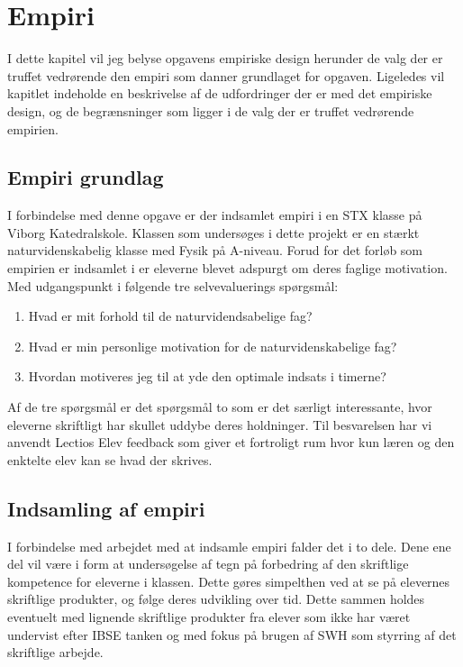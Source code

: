 \chapter{Empiri}
\label{Ch:3}

I dette kapitel vil jeg belyse opgavens empiriske design herunder de valg der er truffet vedrørende den empiri som danner grundlaget for opgaven. Ligeledes vil kapitlet indeholde en beskrivelse af de udfordringer der er med det empiriske design, og de begrænsninger som ligger i de valg der er truffet vedrørende empirien. 

\section{Empiri grundlag}
\label{sec:3.1}
I forbindelse med denne opgave er der indsamlet empiri i en STX klasse på Viborg Katedralskole. Klassen som undersøges i dette projekt er en stærkt naturvidenskabelig klasse med Fysik på A-niveau. Forud for det forløb som empirien er indsamlet i er eleverne blevet adspurgt om deres faglige motivation. Med udgangspunkt i følgende tre selvevaluerings spørgsmål:
\begin{enumerate}
	\item Hvad er mit forhold til de naturvidendsabelige fag?
	\item Hvad er min personlige motivation for de naturvidenskabelige fag?
	\item Hvordan motiveres jeg til at yde den optimale indsats i timerne?
\end{enumerate}
Af de tre spørgsmål er det spørgsmål to som er det særligt interessante, hvor eleverne skriftligt har skullet uddybe deres holdninger. Til besvarelsen har vi anvendt Lectios Elev feedback som giver et fortroligt rum hvor kun læren og den enktelte elev kan se hvad der skrives. 

\section{Indsamling af empiri}
\label{sec:3.2}
I forbindelse med arbejdet med at indsamle empiri falder det i to dele. Dene ene del vil være i form at undersøgelse af tegn på forbedring af den skriftlige kompetence for eleverne i klassen. Dette gøres simpelthen ved at se på elevernes skriftlige produkter, og følge deres udvikling over tid. Dette sammen holdes eventuelt med lignende skriftlige produkter fra elever som ikke har været undervist efter IBSE tanken og med fokus på brugen af SWH som styrring af det skriftlige arbejde.

